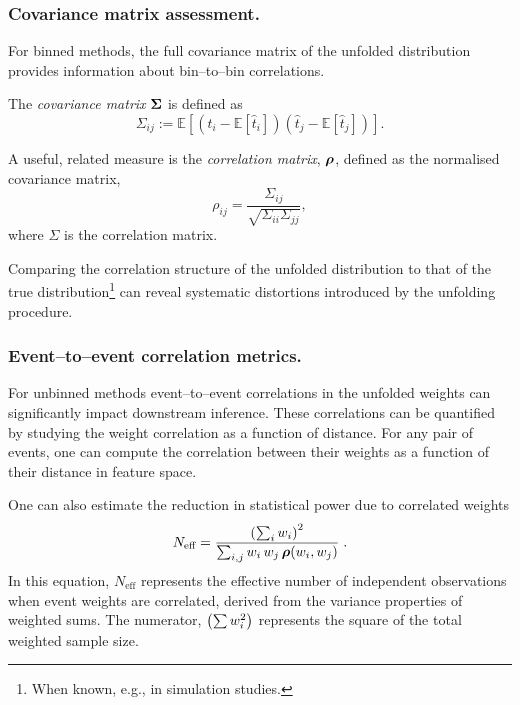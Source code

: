         \subsubsection{Covariance matrix assessment.}
            For binned methods, the full covariance matrix of the unfolded distribution provides information about bin--to--bin correlations.
            \begin{definition}
                The \emph{covariance matrix} \(\vb*{\Sigma}\) is defined as
                \begin{equation}
                    \Sigma_{ij} := \mathbb{E}[(\hat{t}_i - \mathbb{E}[\hat{t}_i])(\hat{t}_j - \mathbb{E}[\hat{t}_j])].
                \end{equation}
            \end{definition}

            \begin{definition}
            \label{def:correlation}
                A useful, related measure is the \emph{correlation matrix}, \(\vb*{\rho}\), defined as the normalised covariance matrix,
                \begin{equation}
                    \rho_{ij} = \frac{\Sigma_{ij}}{\sqrt{\Sigma_{ii}\Sigma_{jj}}},
                \end{equation}
                where \(\Sigma\) is the correlation matrix.
            \end{definition}

            Comparing the correlation structure of the unfolded distribution to that of the true distribution\footnote{When known, e.g., in simulation studies.} can reveal systematic distortions introduced by the unfolding procedure.

        \subsubsection{Event--to--event correlation metrics.}
            For unbinned methods event--to--event correlations in the unfolded weights can significantly impact downstream inference.
            These correlations can be quantified by studying the weight correlation as a function of distance.
            For any pair of events, one can compute the correlation between their weights as a function of their distance in feature space.
            
            One can also estimate the reduction in statistical power due to correlated weights
            \begin{equation}
                \label{eq:n-eff}
                N_{\text{eff}} = \frac{\left(\sum_{i} w_i\right)^2}{\sum_{i,j} w_i\,w_j\,\vb*{\rho}(w_i, w_j)}\;.
            \end{equation}
            In this equation, \(N_{\text{eff}}\) represents the effective number of independent observations when event weights are correlated, derived from the variance properties of weighted sums.
            The numerator, \(\qty(\sum w_i^2)\) represents the square of the total weighted sample size.
            
